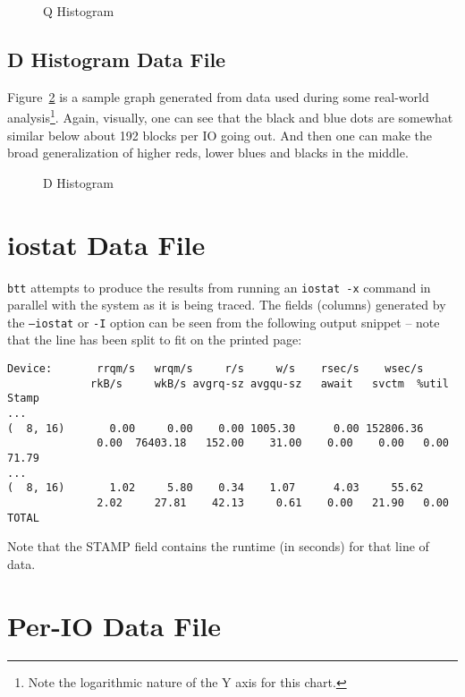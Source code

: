 \documentclass{article}
\begin{document}
  \begin{figure}[hb]
  \leavevmode\centering
  \caption{\label{fig:qhist}Q Histogram}
  \end{figure}

\subsection{\label{sec:dhist}D Histogram Data File}

  Figure~\ref{fig:dhist} is a sample graph generated from data used during
  some real-world analysis\footnote{Note the logarithmic nature of the
  Y axis for this chart.}. Again, visually, one can see that the black
  and blue dots are somewhat similar below about 192 blocks per IO going
  out. And then one can make the broad generalization of higher reds,
  lower blues and blacks in the middle.

  \begin{figure}[hb]
  \leavevmode\centering
  \caption{\label{fig:dhist}D Histogram}
  \end{figure}

\newpage\section{\label{sec:iostat}iostat Data File}
  \texttt{btt} attempts to produce the results from running an
  \texttt{iostat -x} command in parallel with the system as it is being
  traced. The fields (columns) generated by the \texttt{--iostat} or
  \texttt{-I} option can be seen from the following output snippet --
  note that the line has been split to fit on the printed page:

\begin{verbatim}
Device:       rrqm/s   wrqm/s     r/s     w/s    rsec/s    wsec/s
             rkB/s     wkB/s avgrq-sz avgqu-sz   await   svctm  %util   Stamp
...
(  8, 16)       0.00     0.00    0.00 1005.30      0.00 152806.36      
              0.00  76403.18   152.00    31.00    0.00    0.00   0.00   71.79
...
(  8, 16)       1.02     5.80    0.34    1.07      4.03     55.62
              2.02     27.81    42.13     0.61    0.00   21.90   0.00   TOTAL
\end{verbatim}

  Note that the STAMP field contains the runtime (in seconds) for that
  line of data.

\newpage\section{\label{sec:per-io}Per-IO Data File}
\end{document}
